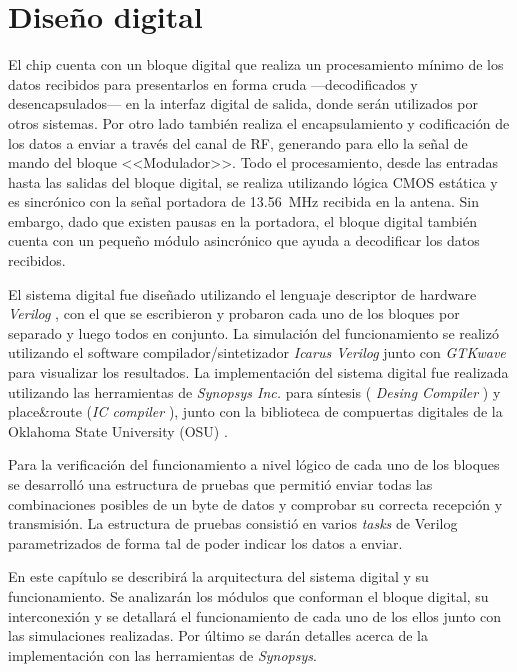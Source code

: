 \chapter{Diseño digital}

El chip cuenta con un bloque digital que realiza un procesamiento 
mínimo de los datos recibidos para presentarlos en forma cruda 
---decodificados y desencapsulados--- en la interfaz digital de 
salida, donde serán utilizados por otros sistemas. Por otro lado 
también realiza el encapsulamiento y codificación de los datos a enviar 
a través del canal de RF,  generando para ello la señal de mando del 
bloque <<Modulador>>. Todo el procesamiento, desde las entradas 
hasta las salidas del bloque digital, se realiza utilizando lógica 
CMOS estática y es sincrónico con la señal portadora de 
\SI{13.56}{\mega\hertz} recibida en la antena. Sin embargo, dado 
que existen pausas en la portadora, el bloque digital también cuenta 
con un pequeño módulo asincrónico que ayuda a decodificar los datos 
recibidos.

El sistema digital fue diseñado utilizando el lenguaje descriptor de 
hardware \emph{Verilog} \cite{Verilog}, con el que se escribieron y 
probaron cada uno de los bloques por separado y luego todos en 
conjunto. La simulación del funcionamiento se realizó utilizando el 
software compilador/sintetizador \emph{Icarus Verilog} \cite{IVerilog} 
junto con \emph{GTKwave} \cite{GTKWave} para visualizar 
los resultados. La implementación del sistema digital fue realizada 
utilizando las herramientas de \emph{Synopsys Inc.} para síntesis (
\emph{Desing Compiler} \cite{SynopsysDC}) y place\&route (\emph{IC 
compiler} \cite{SynopsysICCompiler}), junto con la biblioteca de 
compuertas digitales de la Oklahoma State University (OSU) 
\cite{OSUstandardCells}. 

Para la verificación del funcionamiento a nivel lógico de cada uno 
de los bloques se desarrolló una estructura de pruebas que permitió enviar todas las combinaciones posibles de 
un byte de datos y comprobar su correcta recepción y transmisión. La 
estructura de pruebas consistió en varios \emph{tasks} de Verilog 
parametrizados de forma tal de poder indicar los datos a enviar.

En este capítulo se describirá la arquitectura del sistema digital y su 
funcionamiento. Se analizarán los módulos que conforman el bloque 
digital, su interconexión y se detallará el funcionamiento de cada uno 
de los ellos junto con las simulaciones realizadas. Por último se 
darán detalles acerca de la implementación con las herramientas de 
\emph{Synopsys}.


